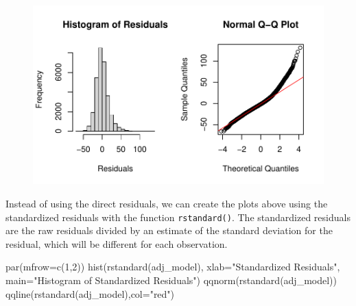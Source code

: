 \documentclass[
  letterpaper,
]{krantz}
\makeatletter
\newenvironment{Shaded}{\begin{snugshade}}{\end{snugshade}}
\newcommand{\AttributeTok}[1]{\textcolor[rgb]{0.40,0.45,0.13}{#1}}
\newcommand{\DecValTok}[1]{\textcolor[rgb]{0.68,0.00,0.00}{#1}}
\newcommand{\FunctionTok}[1]{\textcolor[rgb]{0.28,0.35,0.67}{#1}}
\newcommand{\NormalTok}[1]{\textcolor[rgb]{0.00,0.23,0.31}{#1}}
\newcommand{\StringTok}[1]{\textcolor[rgb]{0.13,0.47,0.30}{#1}}
\newenvironment{kframe}{%
\medskip{}
\setlength{\fboxsep}{.8em}
 \def\at@end@of@kframe{}%
 \ifinner\ifhmode%
  \def\at@end@of@kframe{\end{minipage}}%
  \begin{minipage}{\columnwidth}%
 \fi\fi%
 \def\FrameCommand##1{\hskip\@totalleftmargin \hskip-\fboxsep
 \colorbox{shadecolor}{##1}\hskip-\fboxsep
     \hskip-\linewidth \hskip-\@totalleftmargin \hskip\columnwidth}%
 \MakeFramed {\advance\hsize-\width
   \@totalleftmargin\z@ \linewidth\hsize
   \@setminipage}}%
 {\par\unskip\endMakeFramed%
 \at@end@of@kframe}
\renewenvironment{Shaded}{\begin{kframe}}{\end{kframe}}
\makeatother
\begin{document}
\begin{figure}[H]

{\centering \includegraphics[width=1\textwidth,height=\textheight]{book/10_linear_regression_files/figure-pdf/unnamed-chunk-17-1.pdf}

}

\end{figure}

Instead of using the direct residuals, we can create the plots above
using the standardized residuals with the function \texttt{rstandard()}.
The standardized residuals are the raw residuals divided by an estimate
of the standard deviation for the residual, which will be different for
each observation.

\begin{Shaded}
\begin{Highlighting}[]
\FunctionTok{par}\NormalTok{(}\AttributeTok{mfrow=}\FunctionTok{c}\NormalTok{(}\DecValTok{1}\NormalTok{,}\DecValTok{2}\NormalTok{)) }
\FunctionTok{hist}\NormalTok{(}\FunctionTok{rstandard}\NormalTok{(adj\_model), }\AttributeTok{xlab=}\StringTok{"Standardized Residuals"}\NormalTok{, }
     \AttributeTok{main=}\StringTok{"Histogram of Standardized Residuals"}\NormalTok{) }
\FunctionTok{qqnorm}\NormalTok{(}\FunctionTok{rstandard}\NormalTok{(adj\_model)) }
\FunctionTok{qqline}\NormalTok{(}\FunctionTok{rstandard}\NormalTok{(adj\_model),}\AttributeTok{col=}\StringTok{"red"}\NormalTok{)}
\end{Highlighting}
\end{Shaded}
\end{document}
